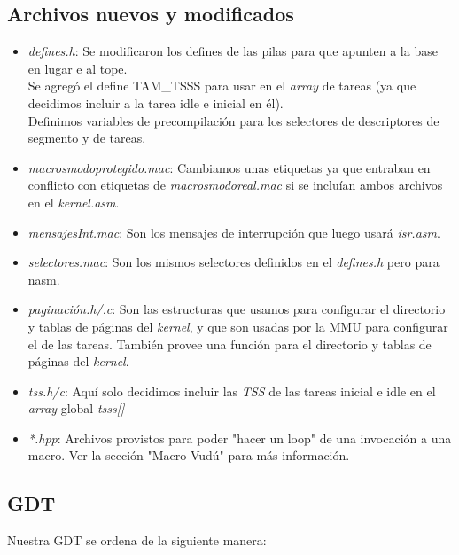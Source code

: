 \subsection{Archivos nuevos y modificados}
\begin{itemize}
	\item \textit{defines.h}: Se modificaron los defines de las pilas para que apunten a la base en lugar e al tope.\\
		Se agregó el define TAM\_TSSS para usar en el \textit{array} de tareas (ya que decidimos incluir a la tarea idle e inicial en él).\\
		Definimos variables de precompilación para los selectores de descriptores de segmento y de tareas.
	\item \textit{macrosmodoprotegido.mac}: Cambiamos unas etiquetas ya que entraban en conflicto con etiquetas de \textit{macrosmodoreal.mac} si se incluían ambos archivos en el \textit{kernel.asm}.
	\item \textit{mensajesInt.mac}: Son los mensajes de interrupción que luego usará \textit{isr.asm}.
	\item \textit{selectores.mac}: Son los mismos selectores definidos en el \textit{defines.h} pero para nasm.
	\item \textit{paginación.h/.c}: Son las estructuras que usamos para configurar el directorio y tablas de páginas del \textit{kernel}, y que son usadas por la MMU para configurar el de las tareas. También provee una función para el directorio y tablas de páginas del \textit{kernel}.
	\item \textit{tss.h/c}: Aquí solo decidimos incluir las \textit{TSS} de las tareas inicial e idle en el \textit{array} global \textit{tsss[]}
	\item \textit{*.hpp}: Archivos provistos para poder "hacer un loop" de una invocación a una macro. Ver la sección "Macro Vudú" para más información.
\end{itemize}

\subsection{GDT}
Nuestra GDT se ordena de la siguiente manera:\\

